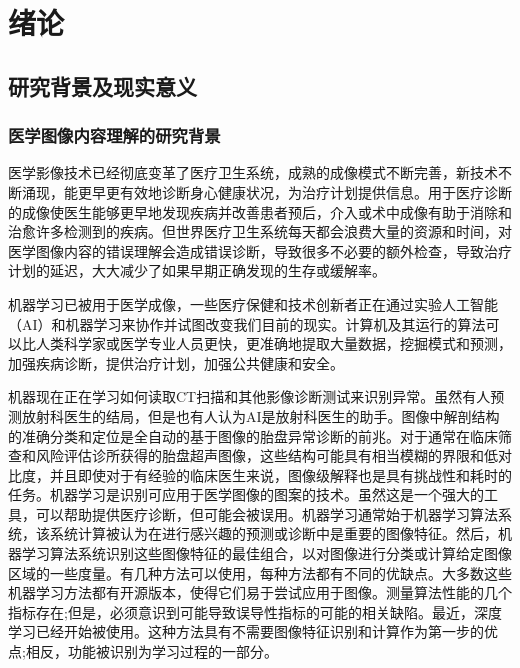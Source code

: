 
\chapter{绪论}
\label{chap:introduction}

\section{研究背景及现实意义}
\subsection{医学图像内容理解的研究背景}

医学影像技术已经彻底变革了医疗卫生系统，成熟的成像模式不断完善，新技术不断涌现，能更早更有效地诊断身心健康状况，为治疗计划提供信息。用于医疗诊断的成像使医生能够更早地发现疾病并改善患者预后，介入或术中成像有助于消除和治愈许多检测到的疾病。但世界医疗卫生系统每天都会浪费大量的资源和时间，对医学图像内容的错误理解会造成错误诊断，导致很多不必要的额外检查，导致治疗计划的延迟，大大减少了如果早期正确发现的生存或缓解率。

机器学习已被用于医学成像，一些医疗保健和技术创新者正在通过实验人工智能（AI）和机器学习来协作并试图改变我们目前的现实。计算机及其运行的算法可以比人类科学家或医学专业人员更快，更准确地提取大量数据，挖掘模式和预测，加强疾病诊断，提供治疗计划，加强公共健康和安全。

机器现在正在学习如何读取CT扫描和其他影像诊断测试来识别异常。虽然有人预测放射科医生的结局，但是也有人认为AI是放射科医生的助手。图像中解剖结构的准确分类和定位是全自动的基于图像的胎盘异常诊断的前兆。对于通常在临床筛查和风险评估诊所获得的胎盘超声图像，这些结构可能具有相当模糊的界限和低对比度，并且即使对于有经验的临床医生来说，图像级解释也是具有挑战性和耗时的任务。机器学习是识别可应用于医学图像的图案的技术。虽然这是一个强大的工具，可以帮助提供医疗诊断，但可能会被误用。机器学习通常始于机器学习算法系统，该系统计算被认为在进行感兴趣的预测或诊断中是重要的图像特征。然后，机器学习算法系统识别这些图像特征的最佳组合，以对图像进行分类或计算给定图像区域的一些度量。有几种方法可以使用，每种方法都有不同的优缺点。大多数这些机器学习方法都有开源版本，使得它们易于尝试应用于图像。测量算法性能的几个指标存在;但是，必须意识到可能导致误导性指标的可能的相关缺陷。最近，深度学习已经开始被使用。这种方法具有不需要图像特征识别和计算作为第一步的优点;相反，功能被识别为学习过程的一部分。

